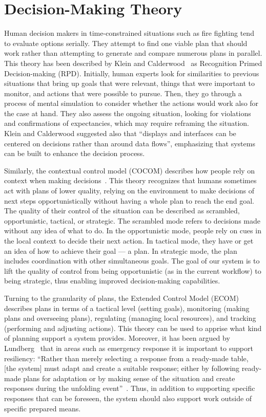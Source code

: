 \section{Decision-Making Theory} \label{sec:theory}
Human decision makers in time-constrained situations such as fire fighting tend to evaluate options serially. They attempt to find one viable plan that should work rather than attempting to generate and compare numerous plans in parallel. This theory has been described by Klein and Calderwood~\cite{KleinCalderwood} as Recognition Primed Decision-making (RPD). Initially, human experts look for similarities to previous situations that bring up goals that were relevant, things that were important to monitor, and actions that were possible to pursue. Then, they go through a process of mental simulation to consider whether the actions would work also for the case at hand. They also assess the ongoing situation, looking for violations and confirmations of expectancies, which may require reframing the situation. Klein and Calderwood suggested also that ``displays and interfaces can be centered on decisions rather than around data flows'', emphasizing that systems can be built to enhance the decision process. 

Similarly, the contextual control model (COCOM) describes how people rely on context when making decisions~\cite{hollnagel2005joint}. This theory recognizes that humans sometimes act with plans of lower quality, relying on the environment to make decisions of next steps opportunistically without having a whole plan to reach the end goal. The quality of their control of the situation can be described as scrambled, opportunistic, tactical, or strategic. The scrambled mode refers to decisions made without any idea of what to do. In the opportunistic mode, people rely on cues in the local context to decide their next action. In tactical mode, they have or get an idea of how to achieve their goal --- a plan. In strategic mode, the plan includes coordination with other simultaneous goals. The goal of our system is to lift the quality of control from being opportunistic (as in the current workflow) to being strategic, thus enabling improved decision-making capabilities.

Turning to the granularity of plans, the Extended Control Model (ECOM)~\cite{hollnagel2005joint} describes plans in terms of a tactical level (setting goals), monitoring (making plans and overseeing plans), regulating (managing local resources), and tracking (performing and adjusting actions). This theory can be used to apprise what kind of planning support a system provides.  Moreover, it has been argued by Lundberg \etal\ that in areas such as emergency response it is important to support resiliency: ``Rather than merely selecting a response from a ready-made table, [the system] must adapt and create a suitable response; either by following ready-made plans for adaptation or by making sense of the situation and create responses during the unfolding event''~\cite{Lundberg2012}. Thus, in addition to supporting specific responses that can be foreseen, the system should also support work outside of specific prepared means.
